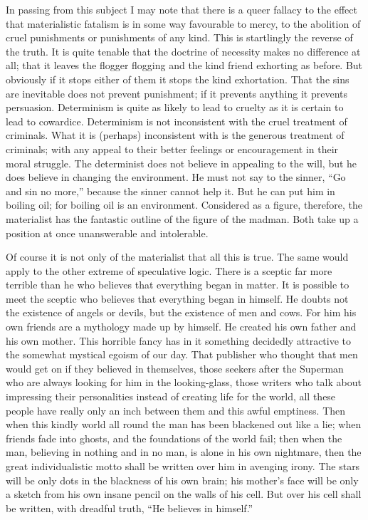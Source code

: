 \documentclass{book}
\begin{document}
In passing from this subject I may note that there is a queer fallacy to the effect that materialistic fatalism is in some way favourable to mercy, to the abolition of cruel punishments or punishments of any kind. This is startlingly the reverse of the truth. It is quite tenable that the doctrine of necessity makes no difference at all; that it leaves the flogger flogging and the kind friend exhorting as before. But obviously if it stops either of them it stops the kind exhortation. That the sins are inevitable does not prevent punishment; if it prevents anything it prevents persuasion. Determinism is quite as likely to lead to cruelty as it is certain to lead to cowardice. Determinism is not inconsistent with the cruel treatment of criminals. What it is (perhaps) inconsistent with is the generous treatment of criminals; with any appeal to their better feelings or encouragement in their moral struggle. The determinist does not believe in appealing to the will, but he does believe in changing the environment. He must not say to the sinner, “Go and sin no more,” because the sinner cannot help it. But he can put him in boiling oil; for boiling oil is an environment. Considered as a figure, therefore, the materialist has the fantastic outline of the figure of the madman. Both take up a position at once unanswerable and intolerable.

Of course it is not only of the materialist that all this is true. The same would apply to the other extreme of speculative logic. There is a sceptic far more terrible than he who believes that everything began in matter. It is possible to meet the sceptic who believes that everything began in himself. He doubts not the existence of angels or devils, but the existence of men and cows. For him his own friends are a mythology made up by himself. He created his own father and his own mother. This horrible fancy has in it something decidedly attractive to the somewhat mystical egoism of our day. That publisher who thought that men would get on if they believed in themselves, those seekers after the Superman who are always looking for him in the looking-glass, those writers who talk about impressing their personalities instead of creating life for the world, all these people have really only an inch between them and this awful emptiness. Then when this kindly world all round the man has been blackened out like a lie; when friends fade into ghosts, and the foundations of the world fail; then when the man, believing in nothing and in no man, is alone in his own nightmare, then the great individualistic motto shall be written over him in avenging irony. The stars will be only dots in the blackness of his own brain; his mother’s face will be only a sketch from his own insane pencil on the walls of his cell. But over his cell shall be written, with dreadful truth, “He believes in himself.”
\end{document}
